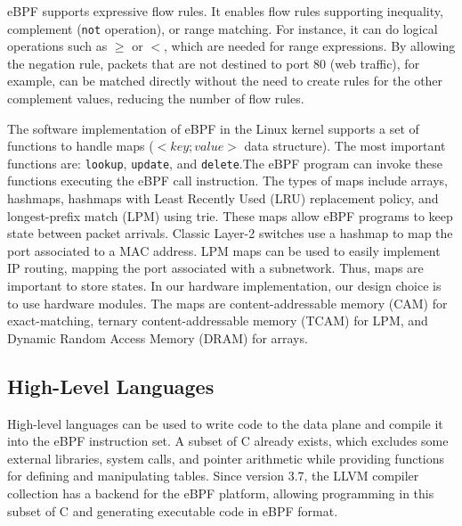 eBPF supports expressive flow rules.
It enables flow rules supporting inequality, complement (\texttt{not} operation), or range matching. 
For instance, it can do logical operations such as $\geq$ or $<$, which are needed for range expressions. 
By allowing the negation rule, packets that are not destined to port 80 (web traffic), for example, can be matched directly without the need to create rules for the other complement values, reducing the number of flow rules. 



The software implementation of eBPF in the Linux kernel supports a set of functions to handle maps ($< key; value >$ data structure). 
The most important functions are: \texttt{lookup}, \texttt{update}, and \texttt{delete}.The eBPF program can invoke these functions executing the eBPF call instruction.
The types of maps include arrays, hashmaps, hashmaps with Least Recently Used (LRU) replacement policy, and%
longest-prefix match (LPM) using trie.
These maps allow eBPF programs to keep state between packet arrivals.
Classic Layer-2 switches use a hashmap to map the port associated to a MAC address.
LPM maps can be used to easily implement IP routing, mapping the port associated with a subnetwork.
Thus, maps are important to store states.
In our hardware implementation, our design choice is to use hardware modules. The maps are content-addressable memory (CAM) for exact-matching, ternary content-addressable memory (TCAM) for LPM, and Dynamic Random Access Memory (DRAM) for arrays.


\subsection{High-Level Languages}


High-level languages can be used to write code to the data plane and compile it into the eBPF instruction set. A subset of C already exists, which excludes some external libraries, system calls, and pointer arithmetic while providing functions for defining and manipulating tables. Since version 3.7, the LLVM compiler collection has a backend for the eBPF platform, allowing programming in this subset of C and generating executable code in eBPF format.

